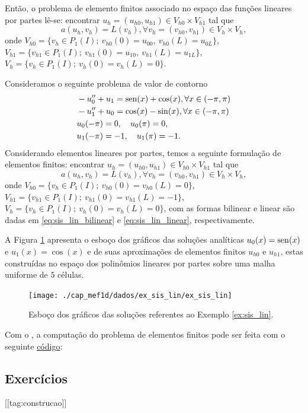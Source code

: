Então, o problema de elemento finitos associado no espaço das funções lineares por partes lê-se: encontrar $u_h = (u_{h0}, u_{h1})\in V_{h0}\times V_{h1}$ tal que
\begin{equation}
  a(u_h, v_h) = L(v_h), \forall v_h = (v_{h0}, v_{h1})\in V_h\times V_h,
\end{equation}
onde $V_{h0} = \{v_h\in P_1(I);~v_{h0}(0)=u_{00},~v_{h0}(L)=u_{0L}\}$, $V_{h1}=\{v_{h1}\in P_1(I);~v_{h1}(0)=u_{10},~v_{h1}(L)=u_{1L}\}$, $V_h = \{v_h\in P_1(I);~v_h(0)=v_h(L)=0\}$.

\begin{ex}\label{ex:sis_lin}
  Consideramos o seguinte problema de valor de contorno
\begin{align}
  &-u_0'' + u_1 = \operatorname{sen}(x)+\cos(x),\forall x\in (-\pi, \pi)\\ 
  &-u_1'' + u_0 = \cos(x)-\sin(x),\forall x\in (-\pi, \pi)\\
  &u_0(-\pi)=0,\quad u_0(\pi)=0,\\
  &u_1(-\pi)=-1,\quad u_1(\pi)=-1.
\end{align}
Considerando elementos lineares por partes, temos a seguinte formulação de elementos finitos: encontrar $u_h = (u_{h0}, u_{h1})\in V_{h0}\times V_{h1}$ tal que
\begin{equation}
  a(u_h, v_h) = L(v_h), \forall v_h = (v_{h0}, v_{h1})\in V_h\times V_h,
\end{equation}
onde $V_{h0} = \{v_h\in P_1(I);~v_{h0}(0)=v_{h0}(L)=0\}$, $V_{h1}=\{v_{h1}\in P_1(I);~v_{h1}(0)=v_{h1}(L)=-1\}$, $V_h = \{v_h\in P_1(I);~v_h(0)=v_h(L)=0\}$, com as formas bilinear e linear são dadas em \eqref{eq:sis_lin_bilinear} e \eqref{eq:sis_lin_linear}, respectivamente.

A Figura \ref{fig:ex_sis_lin} apresenta o esboço dos gráficos das soluções analíticas $u_0(x)=\operatorname{sen}(x)$ e $u_1(x)=\cos(x)$ e de suas aproximações de elementos finitos $u_{h0}$ e $u_{h1}$, estas construídas no espaço dos polinômios lineares por partes sobre uma malha uniforme de $5$ células.

\begin{figure}[h!]
  \centering
  \texttt{[image: ./cap\_mef1d/dados/ex\_sis\_lin/ex\_sis\_lin]}
  \caption{Esboço dos gráficos das soluções referentes ao Exemplo \ref{ex:sis_lin}.}
  \label{fig:ex_sis_lin}
\end{figure}

\ifispython
Com o \fenics, a computação do problema de elementos finitos pode ser feita com o seguinte \href{https://github.com/phkonzen/notas/blob/master/src/MetodoElementosFinitos/cap_mef1d/dados/ex_sis_lin/ex_sis_lin.py}{código}:

\fi
\end{ex}

\subsection{Exercícios}
[[tag:construcao]]

